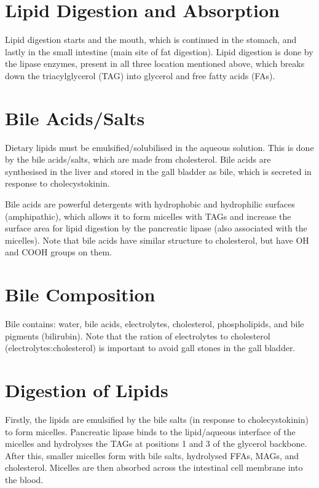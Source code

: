 \section{Lipid Digestion and Absorption}

Lipid digestion starts and the mouth, which is continued in the stomach, and lastly in the small intestine (main site of fat digestion).
Lipid digestion is done by the lipase enzymes, present in all three location mentioned above, which breaks down the triacylglycerol (TAG) into glycerol and free fatty acids (FAs).

\section{Bile Acids/Salts}

Dietary lipids must be emulsified/solubilised in the aqueous solution.
This is done by the bile acids/salts, which are made from cholesterol.
Bile acids are synthesised in the liver and stored in the gall bladder as bile, which is secreted in response to cholecystokinin.

Bile acids are powerful detergents with hydrophobic  and hydrophilic surfaces (amphipathic), which allows it to form micelles with TAGs and increase the surface area for lipid digestion by the pancreatic lipase (also associated with the micelles).
Note that bile acids have similar structure to cholesterol, but have OH and COOH groups on them.

\section{Bile Composition}

Bile contains: water, bile acids, electrolytes, cholesterol, phospholipids, and bile pigments (bilirubin).
Note that the ration of electrolytes to cholesterol (electrolytes:cholesterol) is important to avoid gall stones in the gall bladder.

\section{Digestion of Lipids}

Firstly, the lipids are emulsified by the bile salts (in response to cholecystokinin) to form micelles.
Pancreatic lipase binds to the lipid/aqueous interface of the micelles and hydrolyses the TAGs at positions 1 and 3 of the glycerol backbone.
After this, smaller micelles form with bile salts, hydrolysed FFAs, MAGs, and cholesterol.
Micelles are then absorbed across the intestinal cell membrane into the blood.

